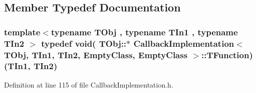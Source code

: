 \subsection{Member Typedef Documentation}
\hypertarget{class_callback_implementation_3_01_t_obj_00_01_t_in1_00_01_t_in2_00_01_empty_class_00_01_empty_class_01_4_a972b47fde4d24656f515cb8f1b974376}{
\subsubsection[{T\-Function}]{\setlength{\rightskip}{0pt plus 5cm}template$<$typename T\-Obj , typename T\-In1 , typename T\-In2 $>$ typedef void( T\-Obj\-::$\ast$ {\bf Callback\-Implementation}$<$ T\-Obj, T\-In1, T\-In2, {\bf Empty\-Class}, {\bf Empty\-Class} $>$\-::T\-Function)(T\-In1, T\-In2)}}\label{class_callback_implementation_3_01_t_obj_00_01_t_in1_00_01_t_in2_00_01_empty_class_00_01_empty_class_01_4_a972b47fde4d24656f515cb8f1b974376}


Definition at line 115 of file Callback\-Implementation.\-h.



